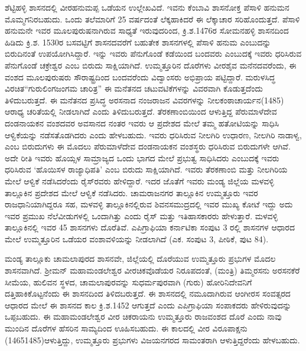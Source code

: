 ಶೆಟ್ಟಿಹಳ್ಳಿ ಶಾಸನದಲ್ಲಿ ವೀರಹನುಮಪ್ಪ ಒಡೆಯನ ಉಲ್ಲೇಖವಿದೆ. ಇವನು ಕೆಂಬಾವಿ ಶಾಸನೋಕ್ತ ಪೆಸಾಳಿ ಹನುಮನ ಮೊಮ್ಮಗನಿರಬಹುದು. ಒಂದು ತಲೆಮಾರಿಗೆ 25 ವರ್ಷದಂತೆ ಲೆಕ್ಕಹಾಕಿದರೆ ಈ ಲೆಕ್ಕಾಚಾರ ಸರಿಹೊಂದುತ್ತದೆ. ಪೆಸಾಳಿ ಹನುಮನೇ ಇವರ ಮೂಲಪುರುಷನಾಗಿರುವ ಸಾಧ್ಯತೆ ಇರುವುದರಿಂದ, ಕ್ರಿ.ಶ.1476ರ ಸೋಮನಹಳ್ಳಿ ಶಾಸನದಿಂದ ಹಿಡಿದು ಕ್ರಿ.ಶ. 1530ರ ಬಸವಟ್ಟಿಗೆ ಶಾಸನದವರೆಗೆ ಬಹುತೇಕ ಶಾಸನಗಳಲ್ಲಿ ಪೆಸಾಳಿ ಹನುಮ ಎಂಬುದನ್ನು ಬಿರುದಿನಂತೆ ಉಪಯೋಗಿಸಿದ್ದಾರೆ. ಇನ್ನು ಇವರು ಪೆನುಗೊಂಡೆ ಕಡೆಯಿಂದ ಬಂದವರು ಎಂಬುದಕ್ಕೆ ಇವರು ಧರಿಸಿರುವ ಪೆನುಗೊಂಡೆ ಚಕ್ರೇಶ್ವರ ಎಂಬ ಬಿರುದು ಸಾಕ್ಷಿಯಾಗಿದೆ. ಉಮ್ಮತ್ತೂರಿನ ದೊರೆಗಳು ವೀರಶೈವ ಮನೆನದವರೆಂದು, ಈ ವಂಶದ ಮೂಲಪುರುಷರು ಸೌರಾಷ್ಟ್ರದಿಂದ ಬಂದವರೆಂದು ವಿದ್ವಾಂಸರು ಅಭಿಪ್ರಾಯ ಪಟ್ಟಿದ್ದಾರೆ. ಮರುಳಸಿದ್ಧ ವಿರಚಿತ\break “ಗುರುಲಿಂಗಜಂಗಮ ಚಾರಿತ್ರ” ಈ ಮನೆತನದ ಚಟುವಟಿಕೆಗಳನ್ನು ವಿವರವಾಗಿ ಕೊಡುತ್ತದೆಂದು ತಿಳಿದುಬರುತ್ತದೆ. ಈ ಮನೆತನದ ಪ್ರಸಿದ್ಧ ಅರಸನಾದ ನಂಜರಾಜನ ವಿವರಗಳನ್ನು ನೀಲಕಂಠಾಚಾರ್ಯನ(1485) ಆರಾಧ್ಯ ಚರಿತೆಯಲ್ಲಿ ನೀಡಲಾಗಿದೆ ಎಂದು ತಿಳಿದುಬರುತ್ತದೆ. ತೆರಕಣಾಂಬಿಯಿಂದ ಆಳುತ್ತಿದ್ದ ಪೆರುಮಾಳೆದೇವ ದಂಡನಾಯಕನ ವಂಶದವರ ಅವಸಾನದ ನಂತರ ಇವರು ಆ ಪ್ರದೇಶದ ಮೇಲೆ ತಮ್ಮ ಹತೋಟಿಯನ್ನು ಸಾಧಿಸಿ ಆಳ್ವಿಕೆಯನ್ನು ನಡೆಸತೊಡಗಿದರು ಎಂದು ಹೇಳಬಹುದು. ಇವರು ಧರಿಸಿರುವ ನೀಲಗಿರಿ ಉಧಾರಣ, ನೀಲಗಿರಿ ನಾಡಾಳ್ವ, ಎಂಬ ಬಿರುದುಗಳು ಈ ಮೊದಲು ಪೆರುಮಾಳೆದೇವ ದಂಡನಾಯಕನ ವಂಶಸ್ಥರು ಧರಿಸಿರುವ ಬಿರುದುಗಳೇ ಆಗಿವೆ. ಅದೇ ರೀತಿ ಇವರು ಹೊಯ್ಸಳ ಸಾಮ್ರಾಜ್ಯದ ಒಂದು ಭಾಗದ ಮೇಲೆ ಪ್ರಭುತ್ವ ಸಾಧಿಸಿದರು ಎಂಬುದಕ್ಕೆ ಇವರು ಧರಿಸಿರುವ `ಹೊಯಿಸಳ ರಾಜ್ಯಾಧಿಪತಿ' ಎಂಬ ಬಿರುದು ಸಾಕ್ಷಿಯಾಗಿದೆ. ಇವರು ತೆರಕಣಾಂಬಿ ಮತ್ತು ನೀಲಗಿರಿಯ ಮೇಲೆ ಆಳ್ವಿಕೆ ನಡೆಸಿದರೆಂದು ರೈಸ್​ರವರು ಹೇಳಿದ್ದಾರೆ. ಇದರ ಜೊತೆಗೆ ಇವರು ಮಂಡ್ಯ ಜಿಲ್ಲೆಯ ಮಳವಳ್ಳಿ ತಾಲ್ಲೂಕಿನ ಪ್ರದೇಶದ ಮೇಲೆ ಆಳ್ವಿಕೆ ನಡೆಸಿದರು. ಚಾಮರಾಜನಗರ ತಾಲ್ಲೂಕಿನ ಉಮ್ಮತ್ತೂರು ಇವರ ರಾಜಧಾನಿಯಾಗಿದ್ದರೂ ಸಹ, ಮಳವಳ್ಳಿ ತಾಲ್ಲೂಕಿನಲ್ಲಿರುವ ಶಿವನಸಮುದ್ರದಲ್ಲಿ ಇವರ ಮುಖ್ಯ ಕೋಟೆ ಇದ್ದು ಅದು ಇವರ ಪ್ರಮುಖ ನೆಲೆವೀಡುಗಳಲ್ಲಿ ಒಂದಾಗಿತ್ತು ಎಂದು ರೈಸ್​ ಮತ್ತು ಇತಿಹಾಸಕಾರರು ಹೇಳುತ್ತಾರೆ. ಮಳವಳ್ಳಿ ತಾಲ್ಲೂಕಿನಲ್ಲಿ ಇವರ 4\enginline{-}5 ಶಾಸನಗಳು ದೊರೆತಿವೆ. ಎಪಿಗ್ರಾಫಿಯಾ ಕರ್ನಾಟಿಕಾ ಸಂಪುಟ 3 ರಲ್ಲಿ ಶಾಸನಗಳ ಆಧಾರದ ಮೇಲೆ ಉಮ್ಮತ್ತೂರಿನ ಒಡೆಯರ ವಂಶಾವಳಿಯನ್ನು ನೀಡಲಾಗಿದೆ (ಎಕ. ಸಂಪುಟ 3, ಪೀಠಿಕೆ, ಪುಟ 84).

ಮಂಡ್ಯ ತಾಲ್ಲೂಕು ಚಾಮಲಾಪುರದ ಶಾಸನವೇ, ಜಿಲ್ಲೆಯಲ್ಲಿ ದೊರೆಯುವ ಉಮ್ಮತ್ತೂರು ಪ್ರಭುಗಳ ಮೊದಲ ಶಾಸನವಾಗಿದೆ. ಶ‍್ರೀಮನ್​ ಮಹಾಮಂಡಲೇಶ್ವರ ವೀರಚಿಕವೊಡೆಯರ ನಿರೂಪದಂತೆ, (ಮಂತ್ರಿ) ತಿಮ್ಮರಸನು ಅರಸನಕೆರೆ ಸೀಮೆಯ, ಹುಲಿವನ ಸ್ಥಳದ, ಚಾಮಲಾಪುರವನ್ನು ಸುಧರ್ಮಪುರವಾಗಿ (ಗುರು) ಹೋರಿನಿದೇವನಿಗೆ ದತ್ತಿಹಾಕಿಕೊಟ್ಟನೆಂದು ಈ ಶಾಸನದಿಂದ ತಿಳಿದಬರುತ್ತದೆ. ಈ ಶಾಸನದಲ್ಲಿ ನಮೂದಾಗಿರುವ ಆಂಗೀರಸ ಸಂವತ್ಸರದ ಆಧಾರದ ಮೇಲೆ ಈ ಶಾಸನದ ಕಾಲ ಕ್ರಿ.ಶ.1452 ಆಗುತ್ತದೆ ಎಂದು ಎಪಿಗ್ರಾಫಿಯಾ ಸಂಪಾಕದರು ಹೇಳಿರುವುದನ್ನು ಒಪ್ಪಬಹುದು. ಈ ಮಹಾಮಂಡಲೇಶ್ವರ ವೀರ ಚಿಕರಾಯನು ಉಮ್ಮತ್ತೂರು ರಾಜವಂಶದ ದೊರೆ ಎಂದು ನಾವು ಮುಂದಿನ ದೊರೆಗಳ ಹೆಸರಿನ ಸಾಮ್ಯದಿಂದ ಊಹಿಸಬಹುದು. ಈ ಕಾಲದಲ್ಲಿ ವೀರ ವಿರೂಪಾಕ್ಷನು (1465\enginline{-}1485)ಆಳುತ್ತಿದ್ದು, ಉಮ್ಮತ್ತೂರು ಪ್ರಭುಗಳು ವಿಜಯನಗರದ ಸಾಮಂತರಾಗಿ ಆಳುತ್ತಿದ್ದರೆಂದು ಹೇಳಬಹುದು.

